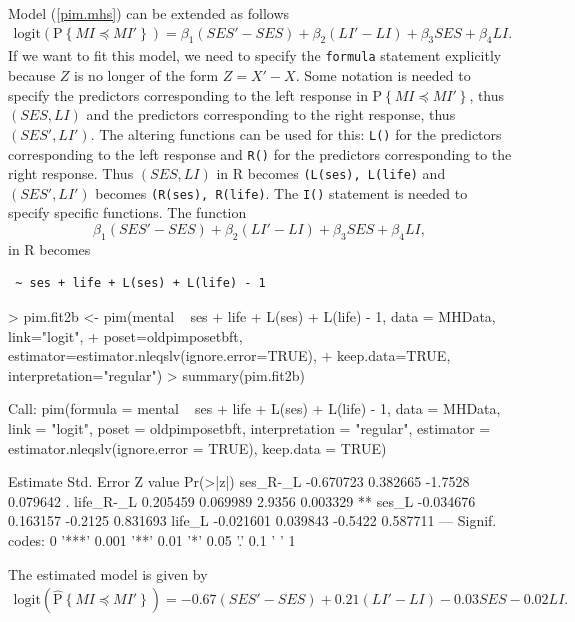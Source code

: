 \documentclass[12pt]{article}
\newcommand{\prob}[1]{\text{P}\left\{#1\right\}}
\newcommand{\hatprob}[1]{\hat{\text{P}}\left\{#1\right\}}
\newcommand{\leqs}{\preccurlyeq}
\begin{document}
Model (\ref{pim.mhs}) can be extended as follows
\begin{eqnarray*}
\text{logit}\left(\prob{MI \leqs MI'} \right) = \beta_1 (SES' - SES) + \beta_2 (LI' - LI) + \beta_3 SES + \beta_4 LI. 
\end{eqnarray*}
If we want to fit this model, we need to specify the \texttt{formula} statement explicitly because $Z$ is no longer of the form $Z = X' - X$. Some notation is needed to specify the predictors corresponding to the left response in $\prob{MI \leqs MI'}$, thus $(SES,LI)$ and the predictors corresponding to the right response, thus $(SES', LI')$. The altering functions can be used for this: \texttt{L()} for the predictors corresponding to the left response and \texttt{R()} for the predictors corresponding to the right response. Thus $(SES, LI)$ in R becomes \texttt{(L(ses), L(life)} and $(SES',LI')$ becomes \texttt{(R(ses), R(life)}. The \texttt{I()} statement is needed to specify specific functions. The function
\[
\beta_1 (SES' - SES) + \beta_2 (LI' - LI) + \beta_3 SES + \beta_4 LI,
\]
in R becomes
\begin{center}
\begin{verbatim}
 ~ ses + life + L(ses) + L(life) - 1
\end{verbatim}
\end{center}
\begin{Schunk}
\begin{Sinput}
> pim.fit2b <- pim(mental ~ ses + life + L(ses) + L(life) - 1, data = MHData, link="logit", 
+ 								 poset=oldpimposetbft, estimator=estimator.nleqslv(ignore.error=TRUE), 
+ 								 keep.data=TRUE, interpretation="regular")
> summary(pim.fit2b)
\end{Sinput}
\begin{Soutput}
Call:
pim(formula = mental ~ ses + life + L(ses) + L(life) - 1, data = MHData, 
    link = "logit", poset = oldpimposetbft, interpretation = "regular", 
    estimator = estimator.nleqslv(ignore.error = TRUE), keep.data = TRUE)

           Estimate Std. Error Z value Pr(>|z|)   
ses_R-_L  -0.670723   0.382665 -1.7528 0.079642 . 
life_R-_L  0.205459   0.069989  2.9356 0.003329 **
ses_L     -0.034676   0.163157 -0.2125 0.831693   
life_L    -0.021601   0.039843 -0.5422 0.587711   
---
Signif. codes:  0 '***' 0.001 '**' 0.01 '*' 0.05 '.' 0.1 ' ' 1 
\end{Soutput}
\end{Schunk}
The estimated model is given by
\begin{eqnarray*}
\text{logit}\left(\hatprob{MI \leqs MI'} \right) = -0.67 (SES' - SES) + 0.21 (LI' - LI)  -0.03 SES  -0.02 LI. 
\end{eqnarray*}
\end{document}
